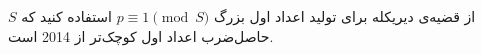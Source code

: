از قضیه‌ی دیریکله برای تولید اعداد اول بزرگ $p \equiv 1 \pmod{S}$ استفاده کنید که $S$ حاصل‌ضرب اعداد اول کوچک‌تر از 2014 است.